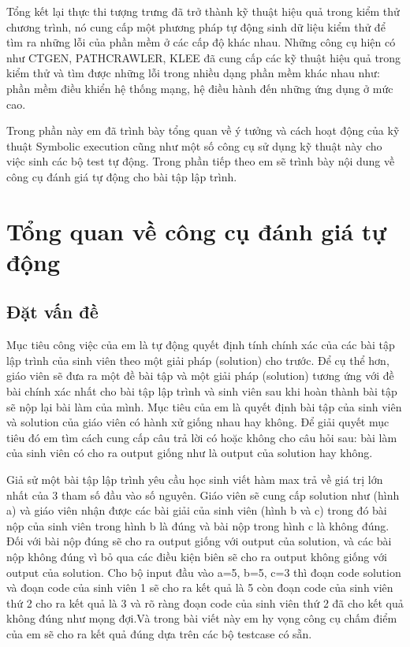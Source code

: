 \documentclass[12pt,a4paper]{report}
\begin{document}
Tổng kết lại thực thi tượng trưng đã trở thành kỹ thuật hiệu quả trong kiểm thử chương trình, nó cung cấp một phương pháp tự động sinh dữ liệu kiểm thử để tìm ra những lỗi của phần mềm ở các cấp độ khác nhau. Những công cụ hiện có như CTGEN, PATHCRAWLER, KLEE đã cung cấp các kỹ thuật hiệu quả trong kiểm thử và tìm được những lỗi trong nhiều dạng phần mềm khác nhau như: phần mềm điều khiển hệ thống mạng, hệ điều hành đến những ứng dụng ở mức cao.

Trong phần này em đã trình bày tổng quan về ý tưởng và cách hoạt động của kỹ thuật Symbolic execution cũng như một số công cụ sử dụng kỹ thuật này cho việc sinh các bộ test tự động. Trong phần tiếp theo em sẽ trình bày nội dung về công cụ đánh giá tự động cho bài tập lập trình.\newpage

\chapter{Tổng quan về công cụ đánh giá tự động}

\section{Đặt vấn đề}

Mục tiêu công việc của em là tự động quyết định tính chính xác của các bài tập lập trình của sinh viên theo một giải pháp (solution) cho trước. Để cụ thể hơn, giáo viên sẽ đưa ra một đề bài tập và một giải pháp (solution) tương ứng với đề bài chính xác nhất cho bài tập lập trình và sinh viên sau khi hoàn thành bài tập sẽ nộp lại bài làm của mình. Mục tiêu của em là quyết định bài tập của sinh viên và solution của giáo viên có hành xử giống nhau hay không. Để giải quyết mục tiêu đó em tìm cách cung cấp câu trả lời có hoặc không cho câu hỏi sau: bài làm của sinh viên có cho ra output giống như là output của solution hay không.

Giả sử một bài tập lập trình yêu cầu học sinh viết hàm max trả về giá trị lớn nhất của 3 tham số đầu vào số nguyên. Giáo viên sẽ cung cấp solution như (hình a) và giáo viên nhận được các bài giải của sinh viên (hình b và c) trong đó bài nộp của sinh viên trong hình b là đúng và bài nộp trong hình c là không đúng. Đối với bài nộp đúng sẽ cho ra output giống với output của solution, và các bài nộp không đúng vì bỏ qua các điều kiện biên sẽ cho ra output không giống với output của solution. Cho bộ input đầu vào a=5, b=5, c=3 thì đoạn code solution và đoạn code của sinh viên 1 sẽ cho ra kết quả là 5 còn đoạn code của sinh viên thứ 2 cho ra kết quả là 3 và rõ ràng đoạn code của sinh viên thứ 2 đã cho kết quả không đúng như mọng đợi.Và trong bài viết này em hy vọng công cụ chấm điểm của em sẽ cho ra kết quả đúng dựa trên các bộ testcase có sẵn.
\newpage
\end{document}
